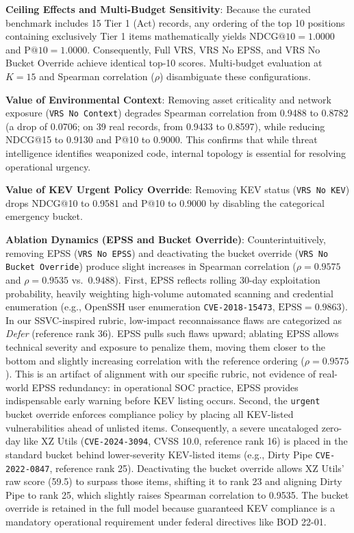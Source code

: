 \documentclass[conference]{IEEEtran}
\begin{document}
\textbf{Ceiling Effects and Multi-Budget Sensitivity}: Because the curated benchmark includes 15 Tier 1 (Act) records, any ordering of the top 10 positions containing exclusively Tier 1 items mathematically yields $\text{NDCG@10} = 1.0000$ and $\text{P@10} = 1.0000$. Consequently, Full VRS, VRS No EPSS, and VRS No Bucket Override achieve identical top-10 scores. Multi-budget evaluation at $K=15$ and Spearman correlation ($\rho$) disambiguate these configurations.

\textbf{Value of Environmental Context}: Removing asset criticality and network exposure (\texttt{VRS No Context}) degrades Spearman correlation from 0.9488 to 0.8782 (a drop of 0.0706; on 39 real records, from 0.9433 to 0.8597), while reducing NDCG@15 to 0.9130 and P@10 to 0.9000. This confirms that while threat intelligence identifies weaponized code, internal topology is essential for resolving operational urgency.

\textbf{Value of KEV Urgent Policy Override}: Removing KEV status (\texttt{VRS No KEV}) drops NDCG@10 to 0.9581 and P@10 to 0.9000 by disabling the categorical emergency bucket.

\textbf{Ablation Dynamics (EPSS and Bucket Override)}: Counterintuitively, removing EPSS (\texttt{VRS No EPSS}) and deactivating the bucket override (\texttt{VRS No Bucket Override}) produce slight increases in Spearman correlation ($\rho = 0.9575$ and $\rho = 0.9535$ vs.\ $0.9488$).
First, EPSS reflects rolling 30-day exploitation probability, heavily weighting high-volume automated scanning and credential enumeration (e.g., OpenSSH user enumeration \texttt{CVE-2018-15473}, $\text{EPSS} = 0.9863$). In our SSVC-inspired rubric, low-impact reconnaissance flaws are categorized as \textit{Defer} (reference rank 36). EPSS pulls such flaws upward; ablating EPSS allows technical severity and exposure to penalize them, moving them closer to the bottom and slightly increasing correlation with the reference ordering ($\rho = 0.9575$). This is an artifact of alignment with our specific rubric, not evidence of real-world EPSS redundancy: in operational SOC practice, EPSS provides indispensable early warning before KEV listing occurs.
Second, the \texttt{urgent} bucket override enforces compliance policy by placing all KEV-listed vulnerabilities ahead of unlisted items. Consequently, a severe uncataloged zero-day like XZ Utils (\texttt{CVE-2024-3094}, CVSS 10.0, reference rank 16) is placed in the standard bucket behind lower-severity KEV-listed items (e.g., Dirty Pipe \texttt{CVE-2022-0847}, reference rank 25). Deactivating the bucket override allows XZ Utils' raw score (59.5) to surpass those items, shifting it to rank 23 and aligning Dirty Pipe to rank 25, which slightly raises Spearman correlation to 0.9535. The bucket override is retained in the full model because guaranteed KEV compliance is a mandatory operational requirement under federal directives like BOD 22-01.
\end{document}
